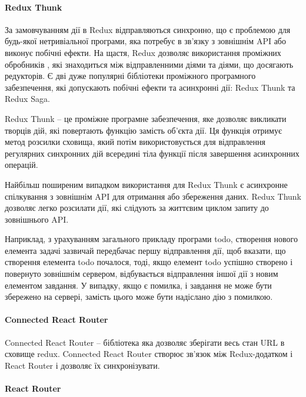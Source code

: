 \paragraph{Redux Thunk}

За замовчуванням дії в Redux відправляються синхронно, що є проблемою для будь-якої нетривіальної програми, яка потребує в зв'язку з зовнішнім API або виконує побічні ефекти. На щастя, Redux дозволяє використання проміжних обробників , які знаходиться між відправленними діями та діями, що досягають редукторів. Є дві дуже популярні бібліотеки проміжного програмного забезпечення, які допускають побічні ефекти та асинхронні дії: Redux Thunk та Redux Saga.

Redux Thunk -- це проміжне програмне забезпечення, яке дозволяє викликати творців дій, які повертають функцію замість об'єкта дії. Ця функція отримує метод розсилки сховища, який потім використовується для відправлення регулярних синхронних дій всередині тіла функції після завершення асинхронних операцій.

Найбільш поширеним випадком використання для Redux Thunk є асинхронне спілкування з зовнішнім API для отримання або збереження даних. Redux Thunk дозволяє легко розсилати дії, які слідують за життєвим циклом запиту до зовнішнього API.

Наприклад, з урахуванням загального прикладу програми todo, створення нового елемента задачі зазвичай передбачає першу відправлення дії, щоб вказати, що створення елемента todo почалося, тоді, якщо елемент todo успішно створено і повернуто зовнішнім сервером, відбувається відправлення іншої дії з новим елементом завдання. У випадку, якщо є помилка, і завдання не може бути збережено на сервері, замість цього може бути надіслано дію з помилкою.



\paragraph{Connected React Router}

Connected React Router -- бібліотека яка дозволяє зберігати весь стан  URL в сховище redux. Connected React Router створює зв'язок між  Redux-додатком і React Router і дозволяє їх синхронізувати.

\paragraph{React Router}

